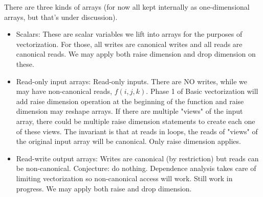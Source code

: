 There are three kinds of arrays (for now all kept internally as one-dimensional arrays, but that's under discussion).
\begin{itemize}

\item Scalars: These are scalar variables we lift into arrays for the purposes of vectorization. 
For those, all writes are canonical writes and all reads are canonical reads. We may apply both raise dimension 
and drop dimension on these.

\item Read-only input arrays: Read-only inputs. There are NO writes, while we may have non-canonical reads, $f(i,j,k)$. 
Phase 1 of Basic vectorization will add raise dimension operation at the beginning of the function and raise dimension 
may reshape arrays. If there are multiple "views" of the input array, there could be multiple raise dimension statements to create
each one of these views. The invariant is that at reads in loops, the reads of "views" of the original input array will be canonical.
Only raise dimension applies.
 
 \item Read-write output arrays: Writes are canonical (by restriction) but reads can be non-canonical. Conjecture:
 do nothing. Dependence analysis takes care of limiting vectorization so non-canonical access will work. 
Still work in progress. We may apply both raise and drop dimension. 

\end{itemize}


%
